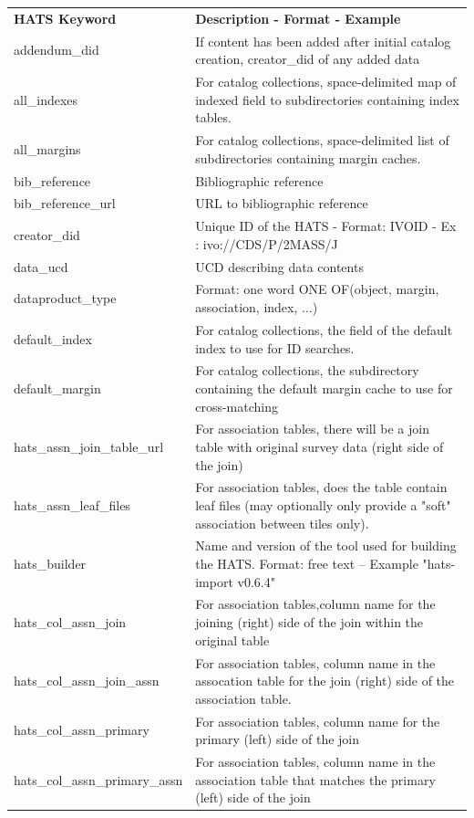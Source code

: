 \documentclass[11pt,a4paper]{ivoa}
\begin{document}
{\footnotesize
\begin{longtable}[h!]{D{0.33\textwidth} D{0.67\textwidth}}
\sptablerule
\textbf{HATS Keyword}&\textbf{Description - Format - Example}\\
\sptablerule
\endhead

addendum\_did &If content has been added after initial catalog creation, creator\_did of any added data \\
all\_indexes &For catalog collections, space-delimited map of indexed field to subdirectories containing index tables. \\
all\_margins &For catalog collections, space-delimited list of subdirectories containing margin caches. \\
bib\_reference &Bibliographic reference \\
bib\_reference\_url &URL to bibliographic reference \\
creator\_did &Unique ID of the HATS - Format: IVOID - Ex : ivo://CDS/P/2MASS/J \\
data\_ucd &UCD describing data contents \\
dataproduct\_type &Format: one word ONE OF(object, margin, association, index, ...) \\
default\_index &For catalog collections, the field of the default index to use for ID searches. \\
default\_margin &For catalog collections, the subdirectory containing the default margin cache to use for cross-matching \\
hats\_assn\_join\_table\_url &For association tables, there will be a join table with original survey data (right side of the join) \\
hats\_assn\_leaf\_files &For association tables, does the table contain leaf files (may optionally only provide a "soft" association between tiles only). \\
hats\_builder &Name and version of the tool used for building the HATS. Format: free text -- Example "hats-import v0.6.4" \\
hats\_col\_assn\_join &For association tables,column name for the joining (right) side of the join within the original table \\
hats\_col\_assn\_join\_assn &For association tables, column name in the assocation table for the join (right) side of the association table. \\
hats\_col\_assn\_primary &For association tables, column name for the primary (left) side of the join \\
hats\_col\_assn\_primary\_assn &For association tables, column name in the association table that matches the primary (left) side of the join \\

\end{longtable}}
\end{document}
